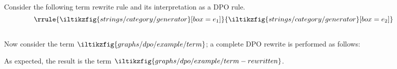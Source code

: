 \begin{center}
\end{center}

\begin{example}
    Consider the following term rewrite rule and its interpretation as a DPO
    rule. \[
        \raisebox{1.5em}{\(\rrule{
                \iltikzfig{strings/category/generator}[box=e_1]
            }{
                \iltikzfig{strings/category/generator}[box=e_2]
            }\)}
        \qquad
        
    \]
    Now consider the term \(
    \iltikzfig{graphs/dpo/example/term}
    \); a complete DPO rewrite is performed as follows:
    \begin{center}
        
    \end{center}
    As expected, the result is the term \(
    \iltikzfig{graphs/dpo/example/term-rewritten}
    \).
\end{example}